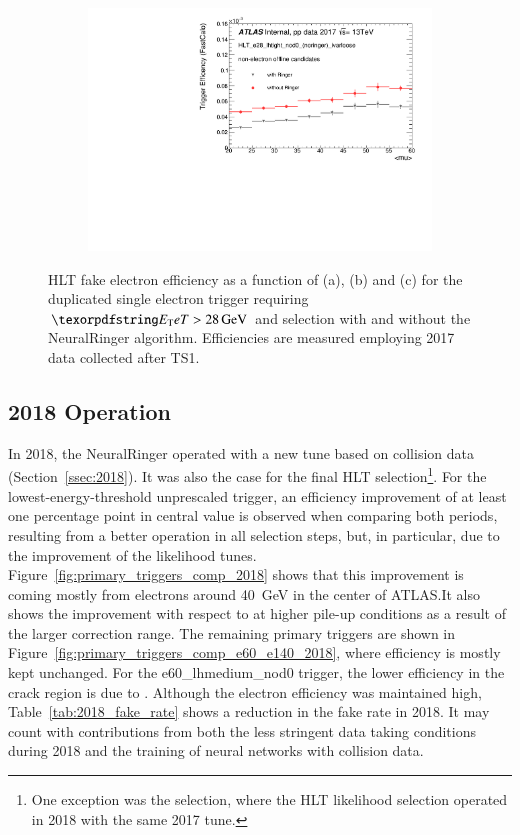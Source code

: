 \begin{figure}[h!tb]
\begin{center}
\begin{subfigure}[c]{.48\textwidth}
\centering
\includegraphics[width=\textwidth]{sections/operation/figures/efficiencies/eff_EGAM7_e28_ringer_and_noringer_2017_after_ts1_mu.pdf}
\caption{}
\end{subfigure}
\caption{HLT fake electron efficiency as a function of \et (a), \eta (b) and
\avgmu (c) for the duplicated single electron trigger requiring $\et >
\SI{28}{\GeV}$ and \tight selection with and without the NeuralRinger algorithm.
Efficiencies are measured employing 2017 data collected after TS1.}%
\label{fig:e28_triggers_fake_hlt}
\end{center}
\end{figure}

\FloatBarrier

\subsection{2018 Operation}\label{ssec:2018_ringer_operation}

In 2018, the NeuralRinger operated with a new tune based on collision data
(Section~\ref{ssec:2018}). It was also the case for the final HLT
selection\footnote{One exception was the \medium{} selection, where the HLT
likelihood selection operated in 2018 with the same 2017 tune.}. For the
lowest-energy-threshold unprescaled trigger, an efficiency
improvement of at least one percentage point in central value is observed when
comparing both periods, resulting from a better operation in all selection
steps, but, in particular, due to the improvement of the likelihood tunes.
Figure~\ref{fig:primary_triggers_comp_2018} shows that this improvement is
coming mostly from electrons around \SI{40}{\GeV} in the center of ATLAS.\@ It
also shows the improvement with respect to \avgmu at higher pile-up conditions
as a result of the larger correction range. The remaining primary triggers are
shown in Figure~\ref{fig:primary_triggers_comp_e60_e140_2018}, where efficiency
is mostly kept unchanged. For the e60\_lhmedium\_nod0 trigger, the lower
efficiency in the crack region is due to \licalo. Although the electron
efficiency was maintained high, Table~\ref{tab:2018_fake_rate} shows a reduction
in the \fastcalo{} fake rate in 2018.  It may count with contributions from both
the less stringent data taking conditions during 2018 and the training of neural
networks with collision data.

